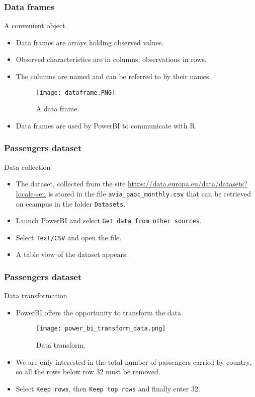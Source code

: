 \documentclass[main.tex]{subfiles}
\begin{document}
\begin{frame}
    \frametitle{Data frames}
\begin{block}{A convenient object.}
    \begin{itemize}
        \item<+-> Data frames are arrays holding observed values.
        \item<+-> Observed characteristics are in columns, observations in rows.
        \item<+-> The columns are named and can be referred to by their names.
        \begin{figure}[htbp]
            \centering
           \texttt{[image: dataframe.PNG]}
            \caption{A data frame.}
            \label{fig:data_frame}
           \end{figure}
        \item<+-> Data frames are used by PowerBI to communicate with R.
    \end{itemize}
\end{block}
\end{frame}
\begin{frame}
    \frametitle{Passengers dataset}
    \begin{block}{Data collection}
        \begin{itemize}
            \item<+-> The dataset, collected from the site \url{https://data.europa.eu/data/datasets?locale=en}
            is stored in the file \texttt{avia\_paoc\_monthly.csv} that can be retrieved on ecampus in the folder \texttt{Datasets}.
            \item<+-> Launch PowerBI and select \texttt{Get data from other sources}.
            \item<+-> Select \texttt{Text/CSV} and open the file.
            \item<+-> A table view of the dataset appears.
        \end{itemize}
    \end{block}
\end{frame}
\begin{frame}
    \frametitle{Passengers dataset}
    \begin{block}{Data transformation}
        \begin{itemize}
            \item<+-> PowerBI offers the opportunity to transform the data.
            \begin{figure}[htbp]
                \centering
                \texttt{[image: power\_bi\_transform\_data.png]}
                \caption{Data transform.}
                \label{fig:data_transform}
            \end{figure}
            \item<+-> We are only interested in the total number of passengers carried by country, so all the rows
            below row 32 must be removed.
            \item<+-> Select \texttt{Keep rows}, then \texttt{Keep top rows} and finally enter 32. 
        \end{itemize}
    \end{block}
\end{frame}
\end{document}
